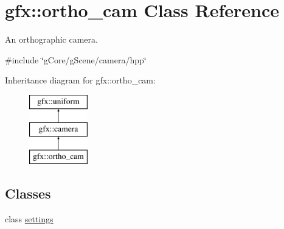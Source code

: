 \hypertarget{classgfx_1_1ortho__cam}{\section{gfx\-:\-:ortho\-\_\-cam Class Reference}
\label{classgfx_1_1ortho__cam}
}


An orthographic camera.  




{\ttfamily \#include \char`\"{}g\-Core/g\-Scene/camera/hpp\char`\"{}}

Inheritance diagram for gfx\-:\-:ortho\-\_\-cam\-:\begin{figure}[H]
\begin{center}
\leavevmode
\includegraphics[height=3.000000cm]{classgfx_1_1ortho__cam}
\end{center}
\end{figure}
\subsection*{Classes}
\begin{DoxyCompactItemize}
\item 
class \hyperlink{classgfx_1_1ortho__cam_1_1settings}{settings}
\end{DoxyCompactItemize}
